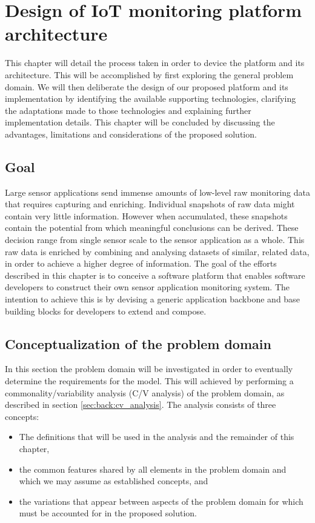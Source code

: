 \newcommand{\archid}{1}
\chapter{Design of IoT monitoring platform architecture}
\label{ch:architecture}
This chapter will detail the process taken in order to device the platform and its architecture. This will be accomplished by first exploring the general problem domain. We will then deliberate the design of our proposed platform and its implementation by identifying the available supporting technologies, clarifying the adaptations made to those technologies and explaining further implementation details. This chapter will be concluded by discussing the advantages, limitations and considerations of the proposed solution.
\section{Goal}
Large sensor applications send immense amounts of low-level raw monitoring data that requires capturing and enriching. Individual snapshots of raw data might contain very little information. However when accumulated, these snapshots contain the potential from which meaningful conclusions can be derived. These decision range from single sensor scale to the sensor application as a whole. This raw data is enriched by combining and analysing datasets of similar, related data, in order to achieve a higher degree of information. The goal of the efforts described in this chapter is to conceive a software platform that enables software developers to construct their own sensor application monitoring system. The intention to achieve this is by devising a generic application backbone and base building blocks for  developers to extend and compose.  
\section{Conceptualization of the problem domain}
In this section the problem domain will be investigated in order to eventually determine the requirements for the model. This will achieved by performing a commonality/variability analysis (C/V analysis) of the problem domain, as described in section \ref{sec:back:cv_analysis}. The analysis consists of three concepts:
\begin{itemize}
\nospace
\item The definitions that will be used in the analysis and the remainder of this chapter, 
\item the common features shared by all elements in the problem domain and which we may assume as established concepts, and 
\item the variations that appear between aspects of the problem domain for which must be accounted for in the proposed solution.
\end{itemize}
